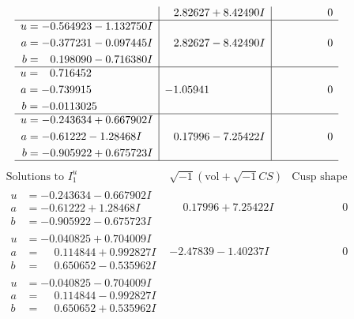\documentclass[1p]{elsarticle_modified}
\theoremstyle{definition}
\newcommand{\I}{\sqrt{-1}}
\begin{document}
$$\begin{array}{c|c|c}
 & \phantom{-}2.82627 + 8.42490 I & \phantom{-0.000000 } 0 \\ \hline\begin{aligned}
u &= -0.564923 - 1.132750 I \\
a &= -0.377231 - 0.097445 I \\
b &= \phantom{-}0.198090 - 0.716380 I\end{aligned}
 & \phantom{-}2.82627 - 8.42490 I & \phantom{-0.000000 } 0 \\ \hline\begin{aligned}
u &= \phantom{-}0.716452\phantom{ +0.000000I} \\
a &= -0.739915\phantom{ +0.000000I} \\
b &= -0.0113025\phantom{ +0.000000I}\end{aligned}
 & -1.05941\phantom{ +0.000000I} & \phantom{-0.000000 } 0 \\ \hline\begin{aligned}
u &= -0.243634 + 0.667902 I \\
a &= -0.61222 - 1.28468 I \\
b &= -0.905922 + 0.675723 I\end{aligned}
 & \phantom{-}0.17996 - 7.25422 I & \phantom{-0.000000 } 0\\
 \hline 
 \end{array}$$\newpage$$\begin{array}{c|c|c}  
\text{Solutions to }I^u_{1}& \I (\text{vol} + \sqrt{-1}CS) & \text{Cusp shape}\\
 \hline 
\begin{aligned}
u &= -0.243634 - 0.667902 I \\
a &= -0.61222 + 1.28468 I \\
b &= -0.905922 - 0.675723 I\end{aligned}
 & \phantom{-}0.17996 + 7.25422 I & \phantom{-0.000000 } 0 \\ \hline\begin{aligned}
u &= -0.040825 + 0.704009 I \\
a &= \phantom{-}0.114844 + 0.992827 I \\
b &= \phantom{-}0.650652 - 0.535962 I\end{aligned}
 & -2.47839 - 1.40237 I & \phantom{-0.000000 } 0 \\ \hline\begin{aligned}
u &= -0.040825 - 0.704009 I \\
a &= \phantom{-}0.114844 - 0.992827 I \\
b &= \phantom{-}0.650652 + 0.535962 I\end{aligned}

\end{array}$$
\end{document}
